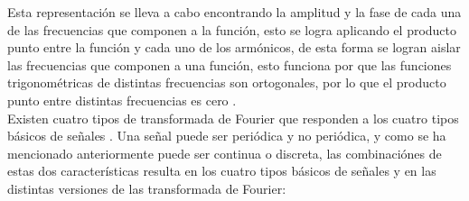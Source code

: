 Esta representaci\'on se lleva a cabo encontrando la amplitud y la fase de cada una de las frecuencias que componen a la funci\'on, esto se logra aplicando el producto punto entre la funci\'on y cada uno de los arm\'onicos, de esta forma se logran aislar las frecuencias que componen a una funci\'on, esto funciona por que las funciones trigonom\'etricas de distintas frecuencias son ortogonales, por lo que el producto punto entre distintas frecuencias es cero \cite{ellis}.\\

Existen cuatro tipos de transformada de Fourier que responden a los cuatro tipos b\'asicos de señales \cite{smith}. Una señal puede ser peri\'odica y no peri\'odica, y como se ha mencionado anteriormente puede ser continua o discreta, las combinaci\'ones de estas dos caracter\'isticas resulta en los cuatro tipos b\'asicos de señales y en las distintas versiones de las transformada de Fourier:
